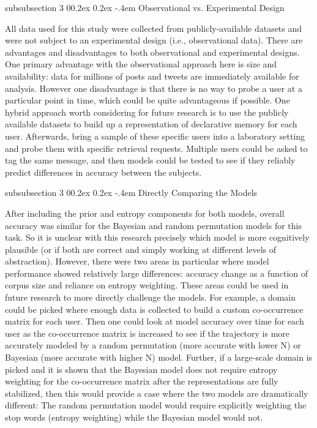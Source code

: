 \documentclass[man,floatsintext,donotrepeattitle]{apa6}
\makeatletter
\renewcommand{\subsubsection}{%
  \@startsection
  {subsubsection}%
  {3}%
  {\parindent}%
  {0\baselineskip \@plus 0.2ex \@minus 0.2ex}%
  {-.4em}%
  {\normalfont\normalsize\bfseries\addperi}}
\makeatother
\begin{document}
\subsubsection{Observational vs. Experimental Design}

All data used for this study were collected from publicly-available datasets and were not subject to an experimental design (i.e., observational data).
There are advantages and disadvantages to both observational and experimental designs.
One primary advantage with the observational approach here is size and availability: data for millions of posts and tweets are immediately available for analysis.
However one disadvantage is that there is no way to probe a user at a particular point in time, which could be quite advantageous if possible.
One hybrid approach worth considering for future research is to use the publicly available datasets to build up a representation of declarative memory for each user.
Afterwards, bring a sample of these specific users into a laboratory setting and probe them with specific retrieval requests.
Multiple users could be asked to tag the same message, and then models could be tested to see if they reliably predict differences in accuracy between the subjects.

\subsubsection{Directly Comparing the Models}

After including the prior and entropy components for both models, overall accuracy was similar for the Bayesian and random permutation models for this task.
So it is unclear with this research precisely which model is more cognitively plausible (or if both are correct and simply working at different levels of abstraction).
However, there were two areas in particular where model performance showed relatively large differences: accuracy change as a function of corpus size and reliance on entropy weighting.
These areas could be used in future research to more directly challenge the models.
For example, a domain could be picked where enough data is collected to build a custom co-occurrence matrix for each user.
Then one could look at model accuracy over time for each user as the co-occurrence matrix is increased to see if the trajectory is more accurately modeled by a random permutation (more accurate with lower N) or Bayesian (more accurate with higher N) model.
Further, if a large-scale domain is picked and it is shown that the Bayesian model does not require entropy weighting for the co-occurrence matrix after the representations are fully stabilized,
then this would provide a case where the two models are dramatically different: The random permutation model would require explicitly weighting the stop words (entropy weighting) while the Bayesian model would not.
\end{document}
